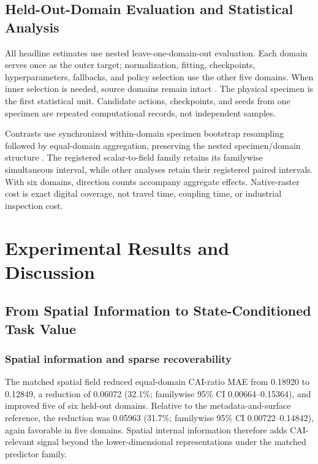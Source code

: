 \documentclass[preprint,12pt]{elsarticle}
\begin{document}
\subsection{Held-Out-Domain Evaluation and Statistical Analysis}
\label{sec:evaluation-statistics}

All headline estimates use nested leave-one-domain-out evaluation. Each domain
serves once as the outer target; normalization, fitting, checkpoints,
hyperparameters, fallbacks, and policy selection use the other five domains.
When inner selection is needed, source domains remain intact
\cite{varma2006bias,gulrajani2021domainbed}. The physical specimen is the first
statistical unit. Candidate actions, checkpoints, and seeds from one specimen
are repeated computational records, not independent samples.

Contrasts use synchronized within-domain specimen bootstrap resampling followed
by equal-domain aggregation, preserving the nested specimen/domain structure
\cite{huang2018cluster}. The registered scalar-to-field family retains its
familywise simultaneous interval, while other analyses retain their registered
paired intervals. With six domains, direction counts accompany aggregate
effects. Native-raster cost is exact digital coverage,
not travel time, coupling time, or industrial inspection cost.

\section{Experimental Results and Discussion}
\label{sec:results-discussion}

\subsection{From Spatial Information to State-Conditioned Task Value}
\label{sec:results-characterization}

\subsubsection{Spatial information and sparse recoverability}
\label{sec:results-spatial-sparse}

The matched spatial field reduced equal-domain CAI-ratio MAE from 0.18920 to
0.12849, a reduction of 0.06072 (32.1\%; familywise 95\% CI
0.00664--0.15364), and improved five of six held-out domains. Relative to the
metadata-and-surface reference, the reduction was 0.05963 (31.7\%; familywise
95\% CI 0.00722--0.14842), again favorable in five domains. Spatial internal
information therefore adds CAI-relevant signal beyond the lower-dimensional
representations under the matched predictor family.
\end{document}
